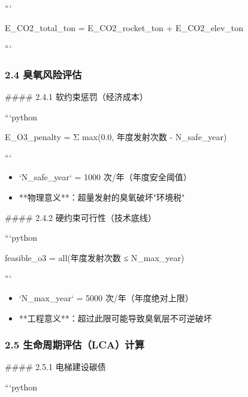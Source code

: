 \documentclass[a4paper,12pt]{article}
\begin{document}
\par
```

\par
E\_CO2\_total\_ton = E\_CO2\_rocket\_ton + E\_CO2\_elev\_ton

\par
```

\par
\subsubsection{2.4 臭氧风险评估}
#### 2.4.1 软约束惩罚（经济成本）

\par
```python

\par
E\_O3\_penalty = Σ max(0.0, 年度发射次数 - N\_safe\_year)

\par
```

\par
\begin{itemize}
\item `N_safe_year` = 1000 次/年（年度安全阈值）
\end{itemize}
\begin{itemize}
\item **物理意义**：超量发射的臭氧破坏"环境税"
\end{itemize}
#### 2.4.2 硬约束可行性（技术底线）

\par
```python

\par
feasible\_o3 = all(年度发射次数 ≤ N\_max\_year)

\par
```

\par
\begin{itemize}
\item `N_max_year` = 5000 次/年（年度绝对上限）
\end{itemize}
\begin{itemize}
\item **工程意义**：超过此限可能导致臭氧层不可逆破坏
\end{itemize}
\subsubsection{2.5 生命周期评估（LCA）计算}
#### 2.5.1 电梯建设碳债

\par
```python
\end{document}
